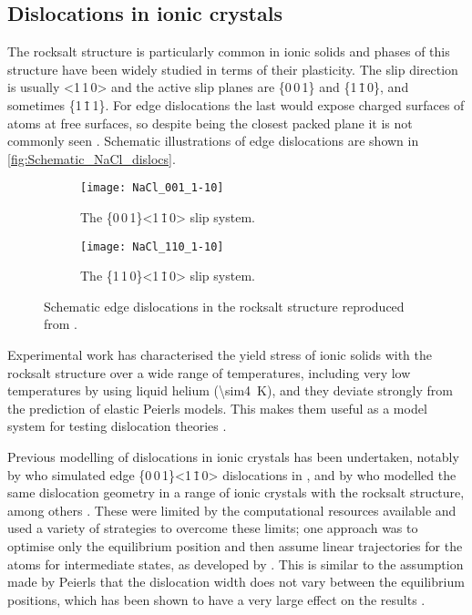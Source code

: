 \subsection{Dislocations in ionic crystals}




The rocksalt structure is particularly common in ionic solids and phases of this structure have been widely studied in terms of their plasticity. The slip direction is usually <1\,1\,0> and the active slip planes are \{0\,0\,1\} and \{1\,\={1}\,0\}, and sometimes \{1\,\={1}\,1\}. For edge dislocations the last would expose charged surfaces of atoms at free surfaces, so despite being the closest packed plane it is not commonly seen \cite{Haasen1985}. Schematic illustrations of edge dislocations are shown in \autoref{fig:Schematic_NaCl_dislocs}.

\begin{figure}
\centering
    \begin{subfigure}{0.8\textwidth}
    \centering
    \texttt{[image: NaCl\_001\_1-10]}
    \caption{The \{0\,0\,1\}<1\,\={1}\,0> slip system.\label{fig:NaCl_110_001_core_structure}}
    \end{subfigure}
\par\bigskip
    \begin{subfigure}{0.8\textwidth}
    \centering
    \texttt{[image: NaCl\_110\_1-10]}
    \caption{The \{1\,1\,0\}<1\,\={1}\,0> slip system.\label{fig:NaCl_110_110_core_structure}}
    \end{subfigure}
\caption[Edge dislocations in the rock salt crystals.]{Schematic edge dislocations in the rocksalt structure reproduced from \cite{Haasen1985}. \label{fig:Schematic_NaCl_dislocs}}
\end{figure}





Experimental work has characterised the yield stress of ionic solids with the rocksalt structure over a wide range of temperatures, including very low temperatures by using liquid helium (\SI{\sim4}{\kelvin}), and they deviate strongly from the prediction of elastic Peierls models. This makes them useful as a model system for testing dislocation theories \cite{Haasen1985}.

Previous modelling of dislocations in ionic crystals has been undertaken, notably by \citet{puls1976} who simulated edge \{0\,0\,1\}<1\,\={1}\,0> dislocations in , and by \citet{Woo1977} who modelled the same dislocation geometry in a range of ionic crystals with the rocksalt structure, among others \cite{Granzer1968,Woo1976,Hoagland1976,Brandt1987,Soullard1991,Foitzik1991}. These were limited by the computational resources available and used a variety of strategies to overcome these limits; one approach was to optimise only the equilibrium position and then assume linear trajectories for the atoms for intermediate states, as developed by \citet{Granzer1968}. This is similar to the assumption made by Peierls \cite{Peierls1940} that the dislocation width does not vary between the equilibrium positions, which has been shown to have a very large effect on the results \cite{Clegg2006,Bulatov1997}.


